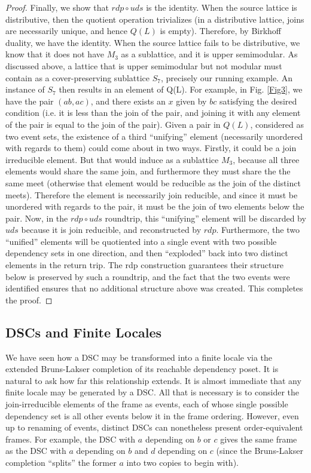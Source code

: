 \documentclass[hoptionsi,review,screen,format=acmsmall]{acmart}
\theoremstyle{definition}
\begin{document}
\begin{proof}
Finally, we show that \(rdp \circ uds\) is the identity. When the source lattice is distributive, then the quotient operation trivializes (in a distributive lattice, joins are necessarily unique, and hence \(Q(L)\) is empty). Therefore, by Birkhoff duality, we have the identity. When the source lattice fails to be distributive, we know that it does not have \(M_3\) as a sublattice, and it is upper semimodular. As discussed above, a lattice that is upper semimodular but not modular must contain as a cover-preserving sublattice \(S_7\), precisely our running example. An instance of \(S_7\) then results in an element of Q(L). For example, in Fig. \ref{Fig3},  we have the pair \((ab,ac)\), and there exists an \(x\) given by \(bc\) satisfying the desired condition (i.e. it is less than the join of the pair, and joining it with any element of the pair is equal to the join of the pair). Given a pair in \(Q(L)\), considered as two event sets, the existence of a third ``unifying'' element (necessarily unordered with regards to them) could come about in two ways. Firstly, it could be a join irreducible element. But that would induce as a sublattice \(M_3\), because all three elements would share the same join, and furthermore they must share the the same meet (otherwise that element would be reducible as the join of the distinct meets). Therefore the element is necessarily join reducible, and since it must be unordered with regards to the pair, it must be the join of two elements below the pair. Now, in the \(rdp \circ uds\) roundtrip, this ``unifying'' element will be discarded by \(uds\) because it is join reducible, and reconstructed by \(rdp\). Furthermore, the two ``unified'' elements will be quotiented into a single event with two possible dependency sets in one direction, and then ``exploded'' back into two distinct elements in the return trip. The rdp construction guarantees their structure below is preserved by such a roundtrip, and the fact that the two events were identified ensures that no additional structure above was created. This completes the proof.
\end{proof}

\subsection{DSCs and Finite Locales}

We have seen how a DSC may be transformed into a finite locale via the extended Bruns-Lakser completion of its reachable dependency poset. It is natural to ask how far this relationship extends. It is almost immediate that any finite locale may be generated by a DSC. All that is necessary is to consider the join-irreducible elements of the frame as events, each of whose single possible dependency set is all other events below it in the frame ordering. However, even up to renaming of events, distinct DSCs can nonetheless present order-equivalent frames. For example, the DSC with \(a\) depending on \(b\) or \(c\) gives the same frame as the DSC with \(a\) depending on \(b\) and \(d\) depending on \(c\) (since the Bruns-Lakser completion ``splits'' the former \(a\) into two copies to begin with). 
\end{document}
